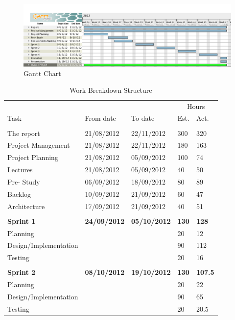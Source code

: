 \begin{figure}
\centering
\includegraphics[width=6in]{image/gantt.png}
\caption{Gantt Chart}
\label{figure:gantt}
\end{figure}

\begin{table}
\caption{Work Breakdown Structure}
\centering
\begin{tabular}{ l l l l l }
\hline 
			&				&				&\multicolumn{2}{c}{Hours}		\\
 Task		& From date		&To date			&Est.			&Act.	                \\ 
\hline \\ [-2.0ex]
 The report     			&21/08/2012		&22/11/2012		&300		&320         	 \\
 Project Management	&21/08/2012		&22/11/2012		&180		&163		\\
 Project Planning		&21/08/2012		&05/09/2012		&100		&74		\\
 Lectures				&21/08/2012		&05/09/2012		&40			&50		\\	
 Pre- Study			&06/09/2012		&18/09/2012		&80			&89		\\
 Backlog				&10/09/2012		&21/09/2012		&60			&47		\\
 Architecture			&17/09/2012		&21/09/2012		&40			&51		\\
\hline \\ [-2.0ex]
 \bf{Sprint 1}			&\bf{24/09/2012}	&\bf{05/10/2012}	&\bf{130}		&\bf{128}	\\
 Planning				&				&				&20			&12		\\
 Design/Implementation	&				&				&90			&112	\\
 Testing				&				&				&20			&16		\\
\hline \\ [-2.0ex]
 \bf{Sprint 2}			&\bf{08/10/2012}	&\bf{19/10/2012}	&\bf{130}		&\bf{107.5}	\\
 Planning				&				&				&20			&22			\\
 Design/Implementation	&				&				&90			&65			\\
 Testing				&				&				&20			&20.5		\\

\end{tabular}
\end{table}
